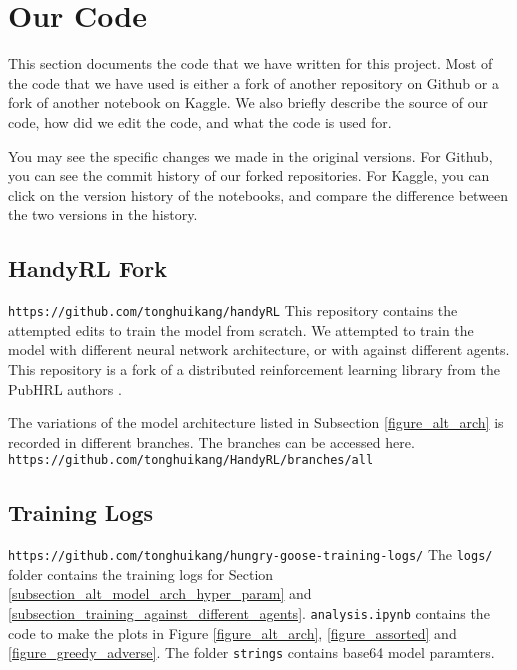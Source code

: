 \section{Our Code}
\label{section_code}

This section documents the code that we have written for this project. Most of the code that we have used is either a fork of another repository on Github or a fork of another notebook on Kaggle. We also briefly describe the source of our code, how did we edit the code, and what the code is used for.

You may see the specific changes we made in the original versions. For Github, you can see the commit history of our forked repositories. For Kaggle, you can click on the version history of the notebooks, and compare the difference between the two versions in the history.


\subsection{HandyRL Fork}
\label{subsection_handyrl_fork}

\verb|https://github.com/tonghuikang/handyRL| \newline\newline
This repository contains the attempted edits to train the model from scratch. We attempted to train the model with different neural network architecture, or with against different agents. This repository is a fork of a distributed reinforcement learning library from the PubHRL authors \cite{repo_handyrl}.

The variations of the model architecture listed in Subsection \ref{figure_alt_arch} is recorded in different branches. The branches can be accessed here. \newline
\verb|https://github.com/tonghuikang/HandyRL/branches/all|


\subsection{Training Logs}
\label{subsection_training_logs}

\verb|https://github.com/tonghuikang/hungry-goose-training-logs/|\newline\newline
The \verb|logs/| folder contains the training logs for Section \ref{subsection_alt_model_arch_hyper_param} and \ref{subsection_training_against_different_agents}. \verb|analysis.ipynb| contains the code to make the plots in Figure \ref{figure_alt_arch}, \ref{figure_assorted} and \ref{figure_greedy_adverse}. The folder \verb|strings| contains base64 model paramters.


